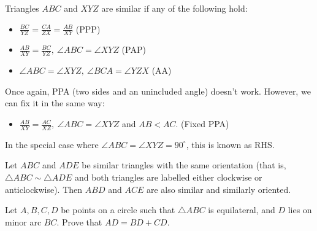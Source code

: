     Triangles $ABC$ and $XYZ$ are similar if any of the following hold:
  \begin{itemize}
    \item $\frac{BC}{YZ}=\frac{CA}{ZX}=\frac{AB}{XY}$ (PPP)
    \item $\frac{AB}{XY}=\frac{BC}{YZ},\ \angle ABC=\angle XYZ$ (PAP)
    \item $\angle ABC=\angle XYZ,\ \angle BCA=\angle YZX$ (AA)
  \end{itemize}
  Once again, PPA (two sides and an unincluded angle) doesn't work. However, we
  can fix it in the same way:
  \begin{itemize}
    \item $\frac{AB}{XY}=\frac{AC}{XZ},\ \angle ABC=\angle XYZ$ and $AB<AC$.
      (Fixed PPA)
  \end{itemize}
  In the special case where $\angle ABC=\angle XYZ=90^\circ$, this is
  known as RHS\@.
\begin{result}{\label{r:b:g:s:1}}
  Let $ABC$ and $ADE$ be similar triangles with the same orientation (that is,
  $\triangle ABC\sim\triangle ADE$ and both triangles are labelled either
  clockwise or anticlockwise). Then $ABD$ and $ACE$ are also similar and
  similarly oriented.
\end{result}
\begin{problem}{\label{p:b:g:s:1}}
  Let $A,B,C,D$ be points on a circle such that $\triangle ABC$ is equilateral,
  and $D$ lies on minor arc $BC$. Prove that $AD=BD+CD$.
\end{problem}
